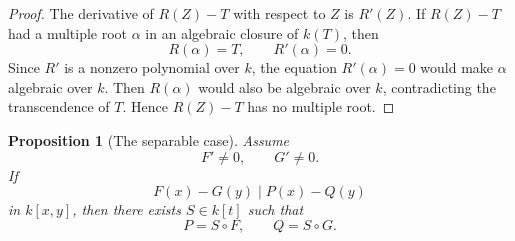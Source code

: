 \documentclass[12pt]{article}
\newtheorem{proposition}[theorem]{Proposition}
\begin{document}
\begin{proof}
The derivative of \(R(Z)-T\) with respect to \(Z\) is \(R'(Z)\).  If \(R(Z)-T\) had a multiple root \(\alpha\) in an algebraic closure of \(k(T)\), then
\[
    R(\alpha)=T,
    \qquad
    R'(\alpha)=0.
\]
Since \(R'\) is a nonzero polynomial over \(k\), the equation \(R'(\alpha)=0\) would make \(\alpha\) algebraic over \(k\).  Then \(R(\alpha)\) would also be algebraic over \(k\), contradicting the transcendence of \(T\).  Hence \(R(Z)-T\) has no multiple root.
\end{proof}

\begin{proposition}[The separable case]\label{prop:separable-case}
Assume
\[
    F'\neq 0,
    \qquad
    G'\neq 0.
\]
If
\[
    F(x)-G(y)\mid P(x)-Q(y)
\]
in \(k[x,y]\), then there exists \(S\in k[t]\) such that
\[
    P=S\circ F,
    \qquad
    Q=S\circ G.
\]
\end{proposition}
\end{document}
